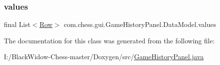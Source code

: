 \mbox{\label{classcom_1_1chess_1_1gui_1_1_game_history_panel_1_1_data_model_aa76576b13ba42a5d8f9994605d187517}} 
\subsubsection{\texorpdfstring{values}{values}}
{\footnotesize\ttfamily final List$<$\mbox{\hyperlink{classcom_1_1chess_1_1gui_1_1_game_history_panel_1_1_row}{Row}}$>$ com.\+chess.\+gui.\+Game\+History\+Panel.\+Data\+Model.\+values\hspace{0.3cm}{\ttfamily [private]}}



The documentation for this class was generated from the following file\+:\begin{DoxyCompactItemize}
\item 
I\+:/\+Black\+Widow-\/\+Chess-\/master/\+Doxygen/src/\mbox{\hyperlink{_game_history_panel_8java}{Game\+History\+Panel.\+java}}\end{DoxyCompactItemize}
